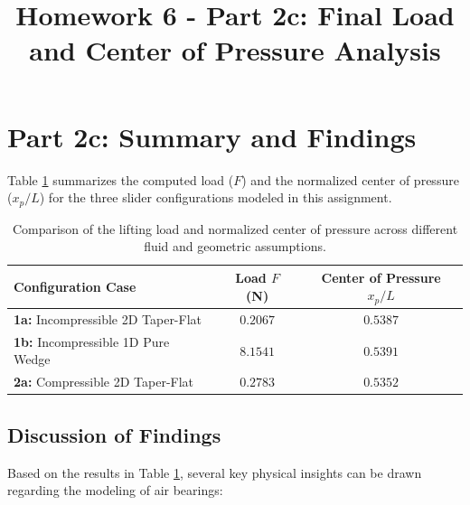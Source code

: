\documentclass{article}
\title{Homework 6 - Part 2c: Final Load and Center of Pressure Analysis}
\author{}
\date{}
\begin{document}
\maketitle

\section*{Part 2c: Summary and Findings}
Table \ref{tab:final_results} summarizes the computed load ($F$) and the normalized center of pressure ($x_p/L$) for the three slider configurations modeled in this assignment.

\begin{table}[H]
    \centering
    \renewcommand{\arraystretch}{1.3}
    \begin{tabular}{lcc}
        \toprule
        \textbf{Configuration Case} & \textbf{Load $F$ (N)} & \textbf{Center of Pressure $x_p/L$} \\
        \midrule
        \textbf{1a:} Incompressible 2D Taper-Flat & $0.2067$ & $0.5387$ \\
        \textbf{1b:} Incompressible 1D Pure Wedge & $8.1541$ & $0.5391$ \\
        \textbf{2a:} Compressible 2D Taper-Flat   & $0.2783$ & $0.5352$ \\
        \bottomrule
    \end{tabular}
    \caption{Comparison of the lifting load and normalized center of pressure across different fluid and geometric assumptions.}
    \label{tab:final_results}
\end{table}

\subsection*{Discussion of Findings}
Based on the results in Table \ref{tab:final_results}, several key physical insights can be drawn regarding the modeling of air bearings:
\end{document}
